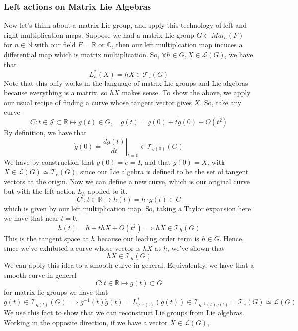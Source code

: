 \documentclass[11pt, oneside]{article}   	%
\theoremstyle{slanted}
\begin{document}
\subsubsection{Left actions on Matrix Lie Algebras} 
Now let's think about a matrix Lie group, and apply this technology 
of left and right multiplication maps. Suppose we had a matrix 
Lie group $ G \subset Mat_n ( F) $ for  $ n \in \mathbb{ N } $ 
with our field $ F = \mathbb{ R} $ or  $ \mathbb{ C} $, 
then our left multiplcation map induces a differential map which is 
matrix multiplication. 
So,  $ \forall h \in G, X \in \mathcal{ L }( G ) $, we have that 
\[
	L^ * _ h  ( X ) = h X \in \mathcal{ T }_h ( G ) 
\]
Note that this only works in the language of matrix
Lie groups and Lie algebras because everything is a matrix, 
so $ h X $ makes sense. 
To show the above, we apply our usual recipe of finding a curve whose tangent
vector gives $ X $. So, take any curve 
\[
	 	C : t \in \mathcal{ J } \subset \mathbb{ R} \mapsto g ( t) \in G  , \quad g( t) = g( 0 ) + t \dot{g }( 0 ) + O ( t^ 2 )  
\] By definition, we have that 
\[
	\dot{ g }( 0 ) = \left. \frac{ dg ( t)  }{dt } \right\vert_{ t =0 } \in \mathcal{ T }_{ g ( 0 ) }( G )  
\]
We have by construction that $ g ( 0 ) = e = I $, and that $ \dot{g }( 0)  = X  $, with 
$ X \in \mathcal{ L } ( G ) \simeq \mathcal{ T }_e ( G )  $, since our Lie algebra is defined to be the set of tangent vectors at the origin. 
Now we can define a new curve, which is our original curve but 
with the left action $ L _ h  $  applied to it. 
\[
	C' : t \in \mathbb{ R} \mapsto h ( t) =  h \cdot g( t) \in G 
\] which is given by our left multiplication map. So, taking a Taylor 
expansion here we have that 
near $ t = 0$, 
\[
	h ( t) = h +  th X + O ( t^ 2) \implies h X \in \mathcal{ T }_ h ( G )  
\] This is the tangent space at $ h $ because our leading order 
term is $ h \in G$. Hence, since we've exhibited 
a curve whose vector is $ h X $ at $ h  $, we've shown that 
\[
	h X \in \mathcal{ T }_ h ( G) 
\] 
We can apply this idea to a smooth curve in general. 
Equivalently, we have that 
a smooth curve in general
\[
 C  : t \in \mathbb{ R} \mapsto g( t) \subset G 
\] for matrix lie groups we have that 
\[
	\dot{ g }( t) \in \mathcal{ T }_{ g ( t) } ( G ) \implies g ^{- 1} ( t) \dot{ g }( t)  = L ^ * _{ g ^{ -1 } ( t) } ( \dot{g }( t) ) \in \mathcal{ T }_{ g ^{ - 1  } ( t) g ( t) } =  \mathcal{ T } _ e ( G ) \simeq \mathcal{ L } ( G )   
\]
We use this fact to show that we 
can reconstruct Lie groups from Lie algebras. Working in the 
opposite direction, if we have a vector $ X \in \mathcal{ L } ( G ) $, 
\end{document}
